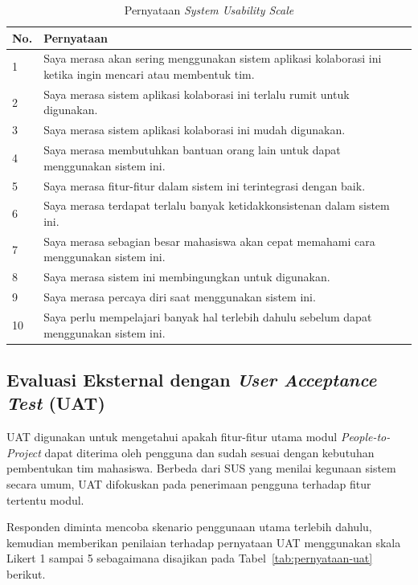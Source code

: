 \begin{table}[H]
  \caption{Pernyataan \emph{System Usability Scale}}
  \label{tab:pernyataan-sus}
  \begin{tabularx}{\textwidth}{p{1cm} X}
    \toprule
    \textbf{No.} & \textbf{Pernyataan} \\
    \midrule
    1 & Saya merasa akan sering menggunakan sistem aplikasi kolaborasi ini ketika ingin mencari atau membentuk tim. \\
    \midrule
    2 & Saya merasa sistem aplikasi kolaborasi ini terlalu rumit untuk digunakan. \\
    \midrule
    3 & Saya merasa sistem aplikasi kolaborasi ini mudah digunakan. \\
    \midrule
    4 & Saya merasa membutuhkan bantuan orang lain untuk dapat menggunakan sistem ini. \\
    \midrule
    5 & Saya merasa fitur-fitur dalam sistem ini terintegrasi dengan baik. \\
    \midrule
    6 & Saya merasa terdapat terlalu banyak ketidakkonsistenan dalam sistem ini. \\
    \midrule
    7 & Saya merasa sebagian besar mahasiswa akan cepat memahami cara menggunakan sistem ini. \\
    \midrule
    8 & Saya merasa sistem ini membingungkan untuk digunakan. \\
    \midrule
    9 & Saya merasa percaya diri saat menggunakan sistem ini. \\
    \midrule
    10 & Saya perlu mempelajari banyak hal terlebih dahulu sebelum dapat menggunakan sistem ini. \\
    \bottomrule
  \end{tabularx}
\end{table}

\subsection{Evaluasi Eksternal dengan \emph{User Acceptance Test} (UAT)}
\label{subsec:uat}

UAT digunakan untuk mengetahui apakah fitur-fitur utama modul \emph{People-to-Project} dapat diterima oleh pengguna dan sudah sesuai dengan kebutuhan pembentukan tim mahasiswa. Berbeda dari SUS yang menilai kegunaan sistem secara umum, UAT difokuskan pada penerimaan pengguna terhadap fitur tertentu modul.

Responden diminta mencoba skenario penggunaan utama terlebih dahulu, kemudian memberikan penilaian terhadap pernyataan UAT menggunakan skala Likert 1 sampai 5 sebagaimana disajikan pada Tabel~\ref{tab:pernyataan-uat} berikut.

